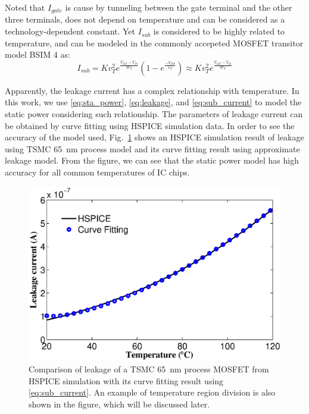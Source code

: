 Noted that $I_{gate}$ is cause by tunneling between the gate terminal and the other three terminals, does not depend on temperature and can be considered as a technology-dependent constant. Yet $I_{sub}$ is considered to be highly related to temperature, and can be modeled in the commonly accepeted MOSFET transitor model BSIM 4 as:
\begin{equation}\label{eq:sub_current}
I_{sub}=Kv_{T}^{2}e^{\frac{V_{GS}-V_{th}} {\eta v_{T}}} (1-e^{\frac {-V_{DS}} {v_{T}} })\approx Kv_{T}^{2}e^{\frac{V_{GS}-V_{th}}{\eta v_{T}}}
\end{equation}

Apparently, the leakage current has a complex relationship with
temperature. In this work, we use \eqref{eq:sta_power},
\eqref{eq:leakage}, and \eqref{eq:sub_current} to model the static
power considering such relationship. The parameters of
leakage current can be obtained by curve fitting using HSPICE simulation
data. In order to see the accuracy of the model used,
Fig.~\ref{fig:leakage} shows an HSPICE simulation result of leakage using TSMC \SI{65}{nm} process model and its curve fitting result using approximate
leakage model. From the figure, we can see that the static power model
has high accuracy for all common temperatures of IC chips.

\begin{figure}%
  \centering
  \includegraphics[width=1\columnwidth]{fig/leakage.eps}
  \caption{Comparison of leakage of a TSMC \SI{65}{nm} process MOSFET from HSPICE
    simulation with its curve fitting result using \eqref{eq:sub_current}. An example of
    temperature region division is also shown in the figure, which will be discussed later.}
  \label{fig:leakage}
\end{figure}

